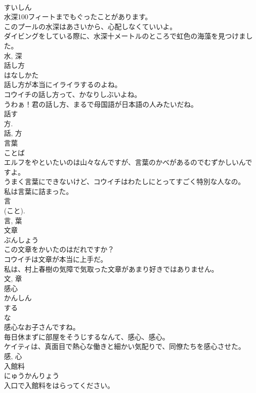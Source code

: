 \documentclass[8pt]{extreport}
\begin{document}
\begin{CJK}{UTF8}{min}
\\	すいしん	
\\	水深100フィートまでもぐったことがあります。	
\\	このプールの水深はあさいから、心配しなくていいよ。	
\\	ダイビングをしている際に、水深十メートルのところで虹色の海藻を見つけました。	
\\	水, 深	
\\	話し方	
\\	はなしかた	
\\	話し方が本当にイライラするのよね。	
\\	コウイチの話し方って、かなりしぶいよね。	
\\	うわぁ！君の話し方、まるで母国語が日本語の人みたいだね。	
\\	話す 
\\	方. 
\\	話, 方	
\\	言葉	
\\	ことば	
\\	エルフをやといたいのは山々なんですが、言葉のかべがあるのでむずかしいんですよ。	
\\	うまく言葉にできないけど、コウイチはわたしにとってすごく特別な人なの。	
\\	私は言葉に詰まった。	
\\	言 
\\	(こと). 
\\	言, 葉	
\\	文章	
\\	ぶんしょう	
\\	この文章をかいたのはだれですか？	
\\	コウイチは文章が本当に上手だ。	
\\	私は、村上春樹の気障で気取った文章があまり好きではありません。	
\\	文, 章	
\\	感心	
\\	かんしん	
\\	する 
\\	な 
\\	感心なお子さんですね。	
\\	毎日休まずに部屋をそうじするなんて、感心、感心。	
\\	ケイティは、真面目で熱心な働きと細かい気配りで、同僚たちを感心させた。	
\\	感, 心	
\\	入館料	
\\	にゅうかんりょう	
\\	入口で入館料をはらってください。	

\end{CJK}
\end{document}
